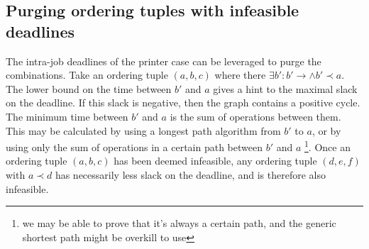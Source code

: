 \documentclass[]{article}
\begin{document}
\subsection{Purging ordering tuples with infeasible deadlines}
The intra-job deadlines of the printer case can be leveraged to purge the combinations. Take an ordering tuple $(a,b,c)$ where there $\exists b' : b' \to \wedge b' \prec a$. The lower bound on the time between $b'$ and $a$ gives a hint to the maximal slack on the deadline. If this slack is negative, then the graph contains a positive cycle. The minimum time between $b'$ and $a$ is the sum of operations between them. This may be calculated by using a longest path algorithm from $b'$ to $a$, or by using only the sum of operations in a certain path between $b'$ and $a$ \footnote{we may be able to prove that it's always a certain path, and the generic shortest path might be overkill to use}. Once an ordering tuple $(a,b,c)$ has been deemed infeasible, any ordering tuple $(d,e,f)$ with $a \prec d$ has necessarily less slack on the deadline, and is therefore also infeasible.
\end{document}
